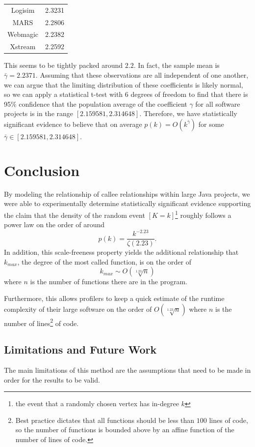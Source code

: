 \documentclass[11pt,a4paper,twocolumn]{article}
\begin{document}
\begin{singlespace}
\begin{table}[H]
\begin{tabular}{|c|c|}
Logisim \cite{Logisim} & 2.3231 \\
MARS \cite{MARS} & 2.2806 \\
Webmagic \cite{WebMagic} & 2.2382 \\
Xstream \cite{Xstream} & 2.2592 \\ \hline
\end{tabular}
\end{table}
\noindent This seems to be tightly packed around $2.2$. In fact, the sample mean is
$\bar \gamma = 2.2371$. Assuming that these observations are all independent
of one another, we can argue that the limiting distribution of these coefficients
is likely normal, so we can apply a statistical t-test with 6 degrees of freedom to find
that there is 95\% confidence that the population average of the coefficient $\gamma$
for all software projects is in the range $[2.159581, 2.314648]$. Therefore, we have
 statistically significant evidence to believe that on average
 $p(k) = O(k^{\bar \gamma})$ for some $\bar \gamma \in [2.159581, 2.314648]$.
\section{Conclusion}
By modeling the relationship of callee relationships within large Java projects, we were
able to experimentally determine statistically significant evidence supporting
the claim that the density of the random event $[K = k]$\footnote{the event that a randomly
chosen vertex has in-degree $k$} roughly follows a power law on the order of around
$$p(k) = \frac{k^{-2.23}}{\zeta(2.23)}.$$ In addition, this scale-freeness property yields
the additional relationship that $k_{max}$, the degree of the most called function, is on the order of
$$k_{max} \sim O(\sqrt[1.23]{n})$$ where $n$ is the number of functions there are in the program.

Furthermore, this allows profilers to keep a quick estimate of the runtime complexity
of their large software on the order of $O(\sqrt[1.23]{n})$ where $n$ is the number of
lines\footnote{Best practice dictates that all functions should be less than $100$ lines
of code, so the number of functions is bounded above by an affine function of
the number of lines of code.} of code.

\subsection*{Limitations and Future Work}

The main limitations of this method are the assumptions that need to be made in
order for the results to be valid.


\end{singlespace}
\end{document}
